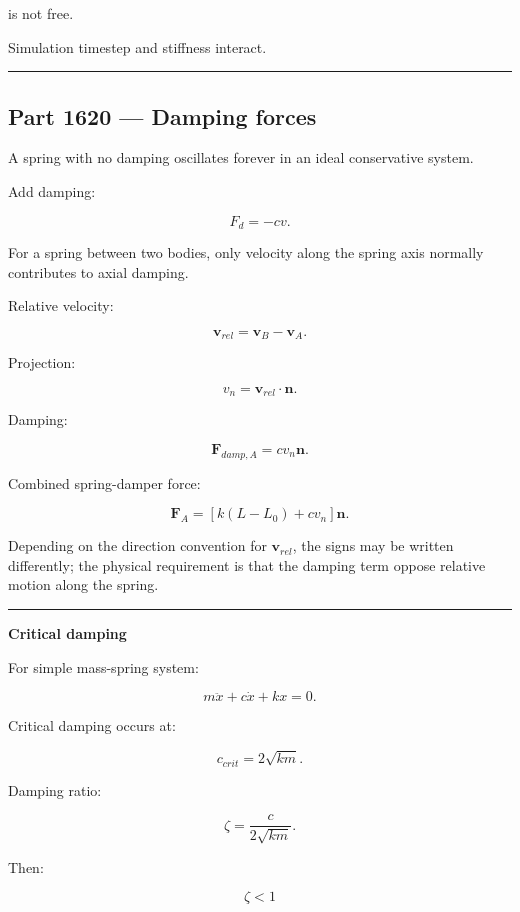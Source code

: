 is not free.

Simulation timestep and stiffness interact.

\begin{center}\rule{0.5\linewidth}{0.5pt}\end{center}

\subsection{Part 1620 --- Damping forces}\label{06-engine-ii-ch034-part-1620-damping-forces}

A spring with no damping oscillates forever in an ideal conservative system.

Add damping:

\[
\boxed{
F_d=-cv.
}
\]

For a spring between two bodies, only velocity along the spring axis normally contributes to axial damping.

Relative velocity:

\[
\mathbf{v}_{rel}
=
\mathbf{v}_B-\mathbf{v}_A.
\]

Projection:

\[
v_n
=
\mathbf{v}_{rel}\cdot\mathbf{n}.
\]

Damping:

\[
\mathbf{F}_{damp,A}
=
c v_n\mathbf{n}.
\]

Combined spring-damper force:

\[
\boxed{
\mathbf{F}_A
=
\left[
k(L-L_0)
+
cv_n
\right]\mathbf{n}.
}
\]

Depending on the direction convention for \(\mathbf{v}_{rel}\), the signs may be written differently; the physical requirement is that the damping term oppose relative motion along the spring.

\begin{center}\rule{0.5\linewidth}{0.5pt}\end{center}

\textbf{Critical damping}

For simple mass-spring system:

\[
m\ddot x+
c\dot x+
kx=0.
\]

Critical damping occurs at:

\[
\boxed{
c_{crit}
=
2\sqrt{km}.
}
\]

Damping ratio:

\[
\zeta
=
\frac{c}
{2\sqrt{km}}.
\]

Then:

\[
\zeta<1
\]

